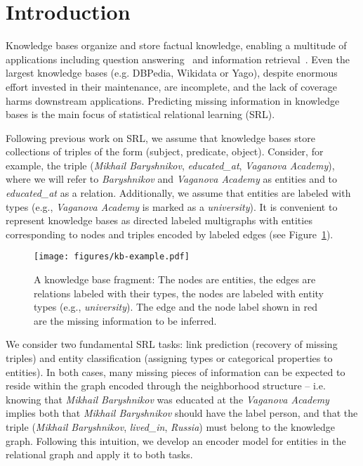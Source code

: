 \documentclass[letterpaper]{article} \usepackage{aaai18}  \usepackage{times}  \usepackage{helvet}  \usepackage{courier}  \usepackage{url}  \usepackage{graphicx}  \frenchspacing
\begin{document}
\section{Introduction}
Knowledge bases organize and store factual knowledge, enabling
a multitude of applications including question answering~\cite{yao2014information,bao2014knowledge,seyler2015generating,hixon2015learning,bordes2015large,dong2015question} and information retrieval~\cite{kotov2012tapping,dalton2014entity,xiong2015query,xiong2015esdrank}.
Even the largest knowledge
bases (e.g. DBPedia, Wikidata or Yago), despite enormous effort invested in their maintenance, are incomplete, and the lack of coverage
harms downstream applications. Predicting missing
information in knowledge bases is the main focus of statistical relational learning (SRL).

Following previous work on SRL, we assume that knowledge bases store collections of triples of the form (subject, predicate, object). Consider, for example, the triple (\textit{Mikhail Baryshnikov}, \textit{educated\_at}, \textit{Vaganova Academy}), where we will refer to {\it Baryshnikov} and {\it Vaganova Academy} as entities and to {\it educated\_at} as a relation. Additionally, we assume that entities are labeled with types (e.g.,  {\it Vaganova Academy} is marked as a {\it university}).
It is convenient to represent knowledge bases as directed labeled multigraphs with entities corresponding to nodes and triples encoded by labeled edges (see Figure~\ref{fig:kb}).

\begin{figure}[t!]
    \centering
    \texttt{[image: figures/kb-example.pdf]}
    \caption{A knowledge base fragment: The nodes are entities, the edges are relations labeled with their types, the nodes are labeled with entity types (e.g., {\it university}). The edge and the node label shown in red are the missing information to be inferred.}
    \label{fig:kb}
\end{figure}

We consider two fundamental SRL tasks: link prediction (recovery of missing triples) and entity classification (assigning types or categorical properties to entities). In both cases, many missing pieces of information can be expected to reside within the graph encoded through the neighborhood structure -- i.e.  knowing that \textit{Mikhail Baryshnikov} was educated at the \textit{Vaganova Academy} implies both that \textit{Mikhail Baryshnikov} should have the label person, and that the triple (\textit{Mikhail Baryshnikov}, \textit{lived\_in}, \textit{Russia}) must belong to the knowledge graph. Following this intuition, we develop an encoder model for entities in the relational graph and apply it to both tasks.
\end{document}
